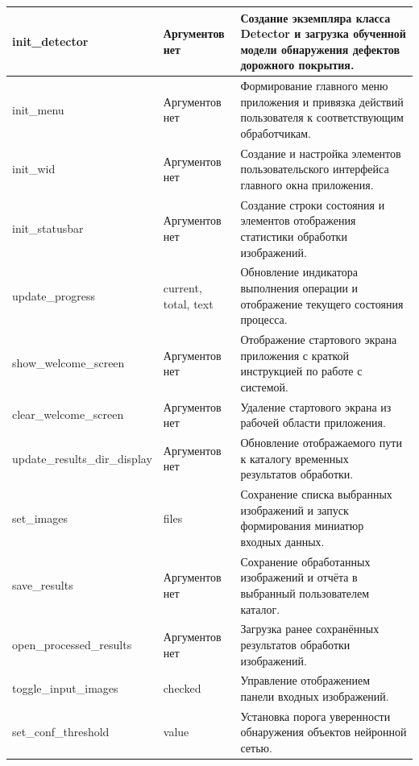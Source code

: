 \begin{xltabular}{\textwidth}{|p{5.5cm}|p{3.5cm}|>{\setlength{\baselineskip}{0.7\baselineskip}}X|}
	init\_detector & Аргументов нет & Создание экземпляра класса Detector и загрузка обученной модели обнаружения дефектов дорожного покрытия. \\ \hline
	
	init\_menu & Аргументов нет & Формирование главного меню приложения и привязка действий пользователя к соответствующим обработчикам. \\ \hline
	
	init\_wid & Аргументов нет & Создание и настройка элементов пользовательского интерфейса главного окна приложения. \\ \hline
	
	init\_statusbar & Аргументов нет & Создание строки состояния и элементов отображения статистики обработки изображений. \\ \hline
	
	update\_progress & current, total, text & Обновление индикатора выполнения операции и отображение текущего состояния процесса. \\ \hline
	
	show\_welcome\_screen & Аргументов нет & Отображение стартового экрана приложения с краткой инструкцией по работе с системой. \\ \hline
	
	clear\_welcome\_screen & Аргументов нет & Удаление стартового экрана из рабочей области приложения. \\ \hline
	
	update\_results\_dir\_display & Аргументов нет & Обновление отображаемого пути к каталогу временных результатов обработки. \\ \hline
	
	set\_images & files & Сохранение списка выбранных изображений и запуск формирования миниатюр входных данных. \\ \hline
	
	save\_results & Аргументов нет & Сохранение обработанных изображений и отчёта в выбранный пользователем каталог. \\ \hline
	
	open\_processed\_results & Аргументов нет & Загрузка ранее сохранённых результатов обработки изображений. \\ \hline
	
	toggle\_input\_images & checked & Управление отображением панели входных изображений. \\ \hline
	
	set\_conf\_threshold & value & Установка порога уверенности обнаружения объектов нейронной сетью. \\ \hline
	

\end{xltabular}

